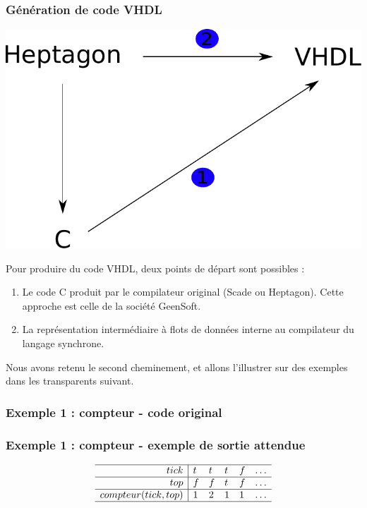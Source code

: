 \documentclass{beamer}
\newcommand{\scade}{{\sc Scade}}
\newcommand{\heptagon}{{\sc Heptagon}}
\begin{document}
\begin{frame}
  \frametitle{Génération de code VHDL}

  \begin{center}
    \includegraphics[scale=0.4]{sens_traduction.pdf}
  \end{center}

  Pour produire du code VHDL, deux points de départ sont possibles :

  \begin{enumerate}
  \item Le code C produit par le compilateur original (\scade{} ou
    \heptagon{}). Cette approche est celle de la société GeenSoft.
  \item La représentation intermédiaire à flots de données interne au
    compilateur du langage synchrone.
  \end{enumerate}

  \pause

  Nous avons retenu le second cheminement, et allons l'illustrer sur des
  exemples dans les transparents suivant.
\end{frame}

\begin{frame}
  \frametitle{Exemple 1 : compteur - code original}

  
\end{frame}


\begin{frame}
  \frametitle{Exemple 1 : compteur - exemple de sortie attendue}

  \[
  \begin{array}{r|llllllllllllllllllllllllllll}
    \hline
    tick & t & t & t & f & \dots \\
    \hline
    top & f & f & t & f & \dots \\
    \hline
    compteur(tick,top) & 1 & 2 & 1 & 1 & \dots \\
    \hline
  \end{array}
  \]
\end{frame}
\end{document}
